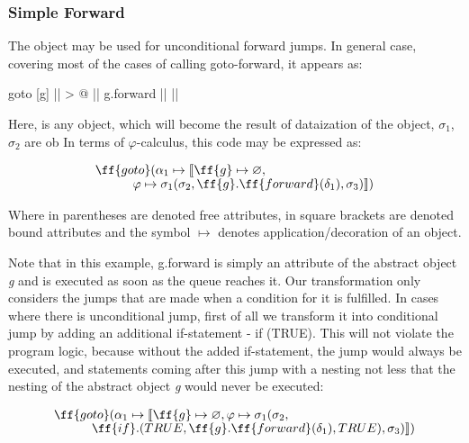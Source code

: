 \documentclass[sigplan,review,11pt,nonacm,natbib=false]{acmart}
\newcommand\br{\\[-4pt]}
\begin{document}
\subsubsection{Simple Forward}

The  object may be used for unconditional forward jumps. In general case, covering most of the cases of calling goto-forward, it appears as:

\begin{ffcode}
goto
  [g]
    || > @
      ||
      g.forward ||
      ||
\end{ffcode}

Here,  is any object, which will become the result of dataization of the  object, $\sigma_1$, $\sigma_2$ are ob
In terms of $\varphi$-calculus, this code may be expressed as:

\begin{equation}
\begin{split}
& \ff{goto} ( \alpha_1 \mapsto \llbracket \ff{g} \mapsto \varnothing, \br
& \quad \quad \quad \varphi \mapsto \sigma_1( \sigma_2, \ff{g}.\ff{forward} (\delta_1), \sigma_3) \rrbracket ) \\
\end{split}
\end{equation}

Where in parentheses are denoted free attributes, in square brackets are denoted bound attributes and the symbol $\mapsto$ denotes application/decoration of an object.

Note that in this example, g.forward is simply an attribute of the abstract object \emph{g} and is executed as soon as the queue reaches it.
Our transformation only considers the jumps that are made when a condition for it is fulfilled.
In cases where there is unconditional jump, first of all we transform it into conditional jump by adding an additional if-statement - if (TRUE).
This will not violate the program logic, because without the added if-statement, the jump would always be executed, and statements coming after this jump with a nesting not less that the nesting of the abstract object \emph{g} would never be executed:

\begin{equation}
\begin{split}
& \ff{goto}(\alpha_1 \mapsto \llbracket \ff{g} \mapsto \varnothing, \varphi \mapsto \sigma_1 (\sigma_2, \br
& \quad \quad \quad \ff{if}.( TRUE, \ff{g}.\ff{forward}(\delta_1), TRUE ), \sigma_3) \rrbracket)\\
\end{split}
\end{equation}
\end{document}
